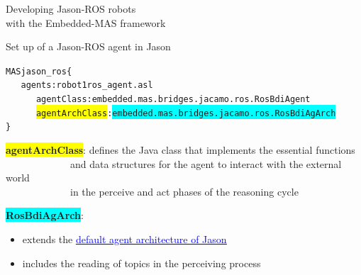 \documentclass[compress]{beamer}
\begin{document}
\begin{frame}[fragile]{Developing Jason-ROS robots\\ {\scriptsize with the Embedded-MAS framework}}
\vspace{1em}
\scriptsize
\begin{block}{Set up of a Jason-ROS agent in Jason}
 \vspace{-1em}
  \begin{alltt}\scriptsize
   MAS jason\_ros \{  
   \ \ \ agents: robot1 ros\_agent.asl
   \ \ \ \ \ \ agentClass: embedded.mas.bridges.jacamo.ros.RosBdiAgent
   \ \ \ \ \ \ \colorbox{yellow}{agentArchClass}: \colorbox{cyan}{embedded.mas.bridges.jacamo.ros.RosBdiAgArch}
  \}
  \end{alltt}    
   \vspace{-1.2em} 
\end{block}

\footnotesize
\colorbox{yellow}{\bf agentArchClass}: defines the Java class that implements the essential functions\\ \ \ \ \ \ \ \ \ \ \ \ \ \ and data structures for the agent to interact with the external world\\ \ \ \ \ \ \ \ \ \ \ \ \ \  {\tiny in the perceive and act phases of the reasoning cycle}

\vspace{.3cm}

\colorbox{cyan}{\bf RosBdiAgArch}: 
\begin{itemize}
 \item extends the \href{https://github.com/jason-lang/jason/blob/main/jason-interpreter/src/main/java/jason/architecture/AgArch.java}{\underline{\textcolor{blue}{default agent architecture of Jason}}}\\
 \item includes the reading of topics in the perceiving process
\end{itemize}


 
\end{frame}
\end{document}
